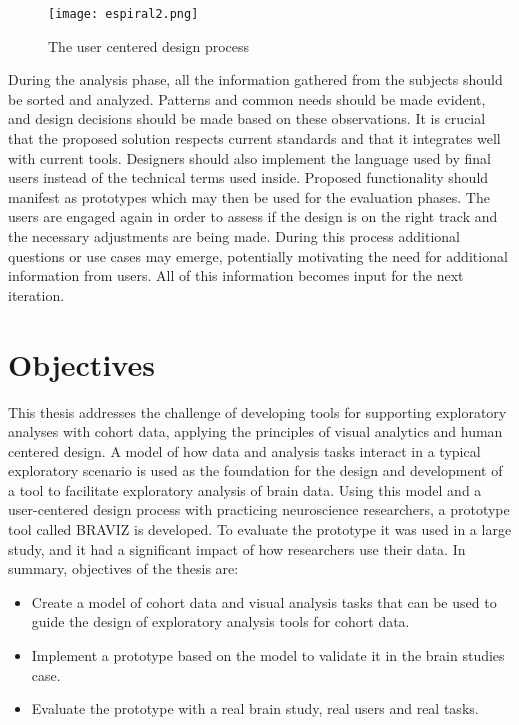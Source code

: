 \begin{figure}
\centering
\texttt{[image: espiral2.png]} 
\caption{ \label{intro_spiral} The user centered design process}
\end{figure}

During the analysis phase, all the information gathered from the subjects should be sorted and analyzed. Patterns and common needs should be made evident, and design decisions should be made based on these observations. It is crucial that the proposed solution respects current standards and that it integrates well with current tools. Designers should also implement the language used by final users instead of the technical terms used inside.  Proposed functionality should manifest as prototypes which may then be used for the evaluation phases. The users are engaged again in order to assess if the design is on the right track and the necessary adjustments are being made. During this process additional questions or use cases may emerge, potentially motivating the need for additional information from users. All of this information becomes input for the next iteration.


\section{Objectives}

This thesis addresses the challenge of developing tools for supporting exploratory analyses with cohort data, applying the principles of visual analytics and human centered design. A model of how data and analysis tasks interact in a typical exploratory scenario is used as the foundation for the design and development of a tool to facilitate exploratory analysis of brain data. Using this model and a user-centered design process with practicing neuroscience researchers, a prototype tool called BRAVIZ is developed. To evaluate the prototype it was used in a large study, and it had a significant impact of how researchers use their data. In summary, objectives of the thesis are:

\begin{itemize}
\item Create a model of cohort data and visual analysis tasks that can be used to guide the design of exploratory analysis tools for cohort data.

\item Implement a prototype based on the model to validate it in the brain studies case.

\item Evaluate the prototype with a real brain study, real users and real tasks.

\end{itemize}

